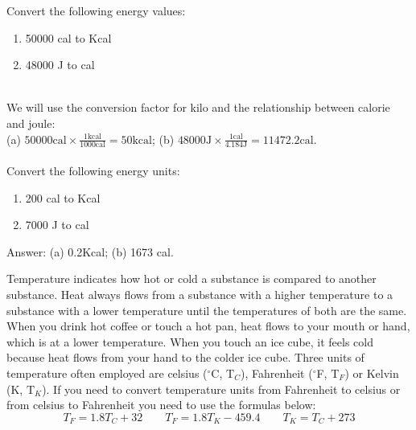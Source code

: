 \documentclass[main.tex]{subfiles}
\begin{document}
\begin{description}
\begin{example} %
Convert the following energy values:
\begin{multicols}{2}
\begin{enumerate}[label=(\alph*)]
\item 50000 cal to Kcal
\item 48000 J to cal
\end{enumerate}
\end{multicols}
\\
We will use the conversion factor for kilo and the relationship between calorie and joule:\\
(a) $50000 \text{cal}\times\frac{1 \text{kcal}}{1000 \text{cal}}=50\text{kcal}  $; (b) $ 48000 \text{J}\times\frac{1 \text{cal}}{4.184 \text{J}}=11472.2 \text{cal} $.\\
\faDiamond\ \\
Convert the following energy units:
\begin{multicols}{2}
\begin{enumerate}[label=(\alph*)]
\item 200 cal to Kcal
\item 7000 J to cal
\end{enumerate}
\end{multicols}
\flushright Answer: (a) 0.2Kcal; (b) 1673 cal.
\end{example}%


\item[\docfilehook{Temperature }{Temperature }]
Temperature indicates how hot or cold a substance is compared to another substance. Heat always flows from a substance with a higher temperature to a substance with a lower temperature until the temperatures of both are the same. When you drink hot coffee or touch a hot pan, heat flows to your mouth or hand, which is at a lower temperature. When you touch an ice cube, it feels cold because heat flows from your hand to the colder ice cube. Three units of temperature often employed are celsius ($^{\circ}$C, $\text{T}_C$), Fahrenheit ($^{\circ}$F, $\text{T}_F$) or Kelvin (K, $\text{T}_K$). If you need to convert temperature units from Fahrenheit  to celsius or from celsius to Fahrenheit you need to use the formulas below:
\begin{equation}
\boxed{   T_F = 1.8T_C  + 32   }
\qquad
\boxed{      T_F = 1.8T_K  -459.4   }
\qquad
\boxed{     T_K = T_C  + 273   }
\label{formula2:2}
\end{equation}


\end{description}
\end{document}
